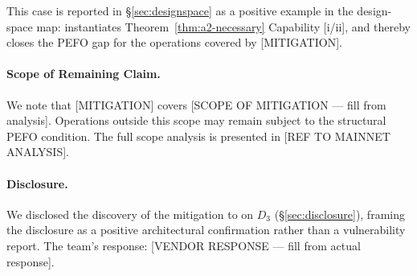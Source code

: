 This case is reported in \S\ref{sec:designspace} as a positive example in the
design-space map: \DEPLOYEDAPP{} instantiates Theorem~\ref{thm:a2-necessary}
Capability [i/ii], and thereby closes the PEFO gap for the operations covered
by [MITIGATION].

\paragraph{Scope of Remaining Claim.}
We note that [MITIGATION] covers [SCOPE OF MITIGATION — fill from analysis].
Operations outside this scope may remain subject to the structural PEFO condition.
The full scope analysis is presented in [REF TO MAINNET ANALYSIS].

\paragraph{Disclosure.}
We disclosed the discovery of the mitigation to \DEPLOYEDAPP{} on $D_3$
(\S\ref{sec:disclosure}), framing the disclosure as a positive architectural
confirmation rather than a vulnerability report. The team's response:
[VENDOR RESPONSE — fill from actual response].

